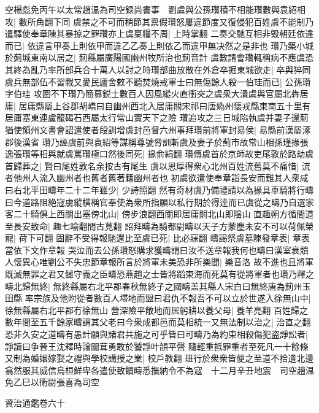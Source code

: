 空楊彪免丙午以太常趙温為司空録尚書事　劉虞與公孫瓚積不相能瓚數與袁紹相攻|{
	數所角翻下同}
虞禁之不可而稍節其禀假瓚怒屢違節度又復侵犯百姓虞不能制乃遣驛使奉章陳其暴掠之罪瓚亦上虞稟糧不周|{
	上時掌翻}
二奏交馳互相非毁朝廷依違而已|{
	依違言甲奏上則依甲而違乙乙奏上則依乙而違甲無决然之是非也}
瓚乃築小城於薊城東南以居之|{
	薊縣屬廣陽國幽州牧所治也薊音計}
虞數請會瓚輒稱病不應虞恐其終為亂乃率所部兵合十萬人以討之時瓚部曲放散在外倉卒掘東城欲走|{
	卒與猝同}
虞兵無部伍不習戰又愛民廬舍敕不聽焚燒戒軍士曰無傷餘人殺一伯珪而已|{
	公孫瓚字伯珪}
攻圍不下瓚乃簡募鋭士數百人因風縱火直衝突之虞衆大潰虞與官屬北犇居庸|{
	居庸縣屬上谷郡胡嶠曰自幽州西北入居庸關宋祁曰唐媯州懷戎縣東南五十里有居庸塞東連盧龍碣石西屬太行常山實天下之險}
瓚追攻之三日城陷執虞并妻子還薊猶使領州文書會詔遣使者段訓增虞封邑督六州事拜瓚前將軍封易侯|{
	易縣前漢屬涿郡後漢省}
瓚乃誣虞前與袁紹等謀稱尊號脅訓斬虞及妻子於薊市故常山相孫瑾掾張逸張瓚等相與就虞罵瓚極口然後同死|{
	掾俞絹翻}
瓚傳虞首於京師故吏尾敦於路劫虞首歸葬之|{
	賢曰尾姓敦名余按古有尾生}
虞以恩厚得衆心北州百姓流舊莫不痛惜|{
	流者他州人流入幽州者也舊者舊著籍幽州者也}
初虞欲遣使奉章詣長安而難其人衆咸曰右北平田疇年二十二年雖少|{
	少詩照翻}
然有奇材虞乃備禮請以為掾具車騎將行疇曰今道路阻絶寇虜縱横稱官奉使為衆所指願以私行期於得逹而已虞從之疇乃自選家客二十騎俱上西關出塞傍北山|{
	傍步浪翻西關即居庸關北山即陰山}
直趣朔方循間道至長安致命|{
	趣七喻翻間古莧翻}
詔拜疇為騎都尉疇以天子方蒙塵未安不可以荷佩榮寵|{
	荷下可翻}
固辭不受得報馳還比至虞已死|{
	比必寐翻}
疇謁祭虞墓陳發章表|{
	章表當依下文作章報}
哭泣而去公孫瓚怒購求獲疇謂曰汝不送章報我何也疇曰漢室衰穨人懷異心唯劉公不失忠節章報所言於將軍未美恐非所樂聞|{
	樂音洛}
故不進也且將軍既滅無罪之君又讎守義之臣疇恐燕趙之士皆將蹈東海而死莫有從將軍者也瓚乃釋之疇北歸無終|{
	無終縣屬右北平郡春秋無終子之國疇盖其縣人宋白曰無終唐為薊州玉田縣}
率宗族及他附從者數百人埽地而盟曰君仇不報吾不可以立於世遂入徐無山中|{
	徐無縣屬右北平郡冇徐無山}
營深險平敞地而居躬耕以養父母|{
	養羊亮翻}
百姓歸之數年間至五千餘家疇謂其父老曰今衆成都邑而莫相統一又無法制以治之|{
	治直之翻}
恐非久安之道疇有愚計願與諸君共施之可乎皆曰可疇乃為約束相殺傷犯盗諍訟者|{
	諍讀曰争晉王沈釋時論闟茸勇敢於饕諍叶韻平聲}
隨輕重抵罪重者至死凡一十餘條又制為婚姻嫁娶之禮與學校講授之業|{
	校戶教翻}
班行於衆衆皆便之至道不拾遺北邊翕然服其威信烏桓鮮卑各遣使致饋疇悉撫納令不為寇　十二月辛丑地震　司空趙温免乙巳以衛尉張喜為司空

資治通鑑卷六十
